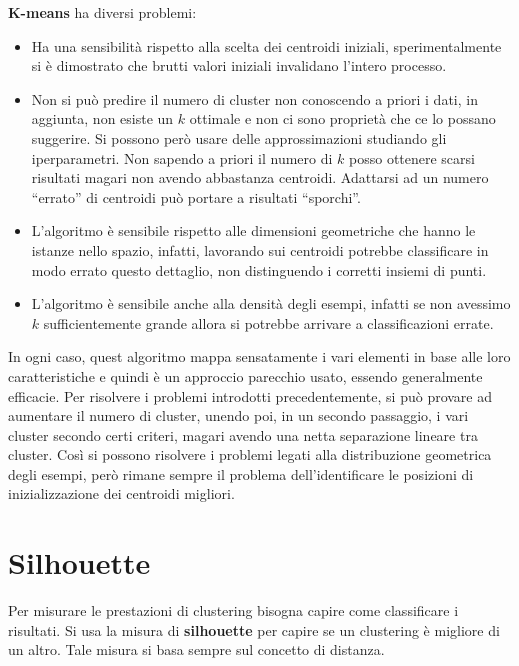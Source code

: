 \textbf{K-means} ha diversi problemi:
\begin{itemize}
    \item Ha una sensibilità rispetto alla scelta dei centroidi iniziali,
          sperimentalmente si è dimostrato che brutti valori iniziali invalidano
          l'intero processo.
    \item Non si può predire il numero di cluster non conoscendo a priori i dati,
          in aggiunta, non esiste un $k$ ottimale e non ci sono proprietà che ce
          lo possano suggerire. Si possono però usare delle approssimazioni
          studiando gli iperparametri. Non sapendo a priori il numero di $k$ posso
          ottenere scarsi risultati magari non avendo abbastanza centroidi.
          Adattarsi ad un numero “errato” di centroidi può portare a risultati
          “sporchi”.
    \item L'algoritmo è sensibile rispetto alle dimensioni geometriche che hanno
          le istanze nello spazio, infatti, lavorando sui centroidi potrebbe
          classificare in modo errato questo dettaglio, non distinguendo i corretti
          insiemi di punti.
    \item L'algoritmo è sensibile anche alla densità degli esempi, infatti se non
          avessimo $k$ sufficientemente grande allora si potrebbe arrivare a
          classificazioni errate.
\end{itemize}
In ogni caso, quest algoritmo mappa sensatamente i vari elementi in base alle
loro caratteristiche e quindi è un approccio parecchio usato, essendo generalmente
efficacie. Per risolvere i problemi introdotti precedentemente, si può provare
ad aumentare il numero di cluster, unendo poi, in un secondo passaggio, i vari
cluster secondo certi criteri, magari avendo una netta separazione lineare tra
cluster. Così si possono risolvere i problemi legati alla distribuzione geometrica
degli esempi, però rimane sempre il problema dell'identificare le posizioni di
inizializzazione dei centroidi migliori.
\section{Silhouette}
Per misurare le prestazioni di clustering bisogna capire come classificare i
risultati. Si usa la misura di \textbf{silhouette} per capire se un clustering è
migliore di un altro. Tale misura si basa sempre sul concetto di distanza.

